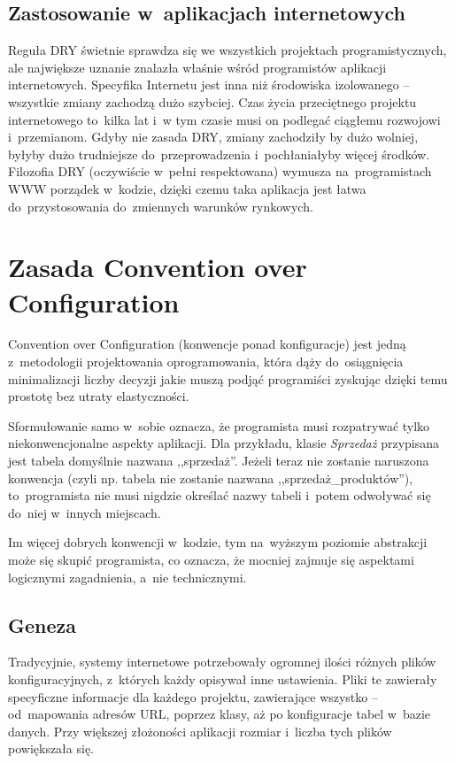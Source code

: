 \documentclass[a4paper,12pt,oneside]{report}
\begin{document}
\subsection{Zastosowanie w~aplikacjach internetowych}
\label{dry:web}
Reguła DRY świetnie sprawdza się we wszystkich projektach programistycznych, ale największe uznanie znalazła właśnie wśród programistów aplikacji internetowych. Specyfika Internetu jest inna niż środowiska izolowanego -- wszystkie zmiany zachodzą dużo szybciej. Czas życia przeciętnego projektu internetowego to~kilka lat i~w tym czasie musi on podlegać ciągłemu rozwojowi i~przemianom. Gdyby nie zasada DRY, zmiany zachodziły by dużo wolniej, byłyby dużo trudniejsze do~przeprowadzenia i~pochłaniałyby więcej środków. Filozofia DRY (oczywiście w~pełni respektowana) wymusza na~programistach WWW porządek w~kodzie, dzięki czemu taka aplikacja jest łatwa do~przystosowania do~zmiennych warunków rynkowych.

\section{Zasada Convention over Configuration}
\label{sec:coc}
Convention over Configuration (konwencje ponad konfiguracje) jest jedną z~metodologii projektowania oprogramowania, która dąży do~osiągnięcia minimalizacji liczby decyzji jakie muszą podjąć programiści zyskując dzięki temu prostotę bez utraty elastyczności.

Sformułowanie samo w~sobie oznacza, że programista musi rozpatrywać tylko niekonwencjonalne aspekty aplikacji. Dla przykładu, klasie \emph{Sprzedaż} przypisana jest tabela domyślnie nazwana ,,sprzedaż''. Jeżeli teraz nie zostanie naruszona konwencja (czyli np. tabela nie zostanie nazwana ,,sprzedaż\_produktów''), to~programista nie musi nigdzie określać nazwy tabeli i~potem odwoływać się do~niej w~innych miejscach.

Im więcej dobrych konwencji w~kodzie, tym na~wyższym poziomie abstrakcji może się skupić programista, co oznacza, że mocniej zajmuje się aspektami logicznymi zagadnienia, a~nie technicznymi.

\subsection{Geneza}
\label{sub:geneza}
Tradycyjnie, systemy internetowe potrzebowały ogromnej ilości różnych plików konfiguracyjnych, z~których każdy opisywał inne ustawienia. Pliki te zawierały specyficzne informacje dla każdego projektu, zawierające wszystko -- od~mapowania adresów URL, poprzez klasy, aż po konfiguracje tabel w~bazie danych. Przy większej złożoności aplikacji rozmiar i~liczba tych plików powiększała się.
\end{document}
